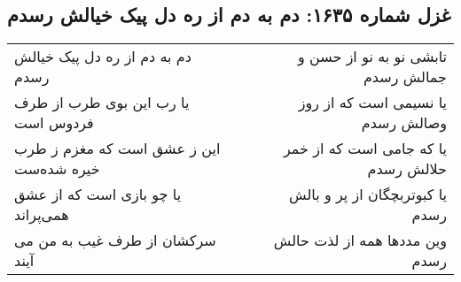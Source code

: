 \begin{center}
\section*{غزل شماره ۱۶۳۵: دم به دم از ره دل پیک خیالش رسدم}
\label{sec:1635}
\begin{longtable}{l p{0.5cm} r}
دم به دم از ره دل پیک خیالش رسدم
&&
تابشی نو به نو از حسن و جمالش رسدم
\\
یا رب این بوی طرب از طرف فردوس است
&&
یا نسیمی است که از روز وصالش رسدم
\\
این ز عشق است که مغزم ز طرب خیره شده‌ست
&&
یا که جامی است که از خمر حلالش رسدم
\\
یا چو بازی است که از عشق همی‌پراند
&&
یا کبوتربچگان از پر و بالش رسدم
\\
سرکشان از طرف غیب به من می آیند
&&
وین مددها همه از لذت حالش رسدم
\\
\end{longtable}
\end{center}
